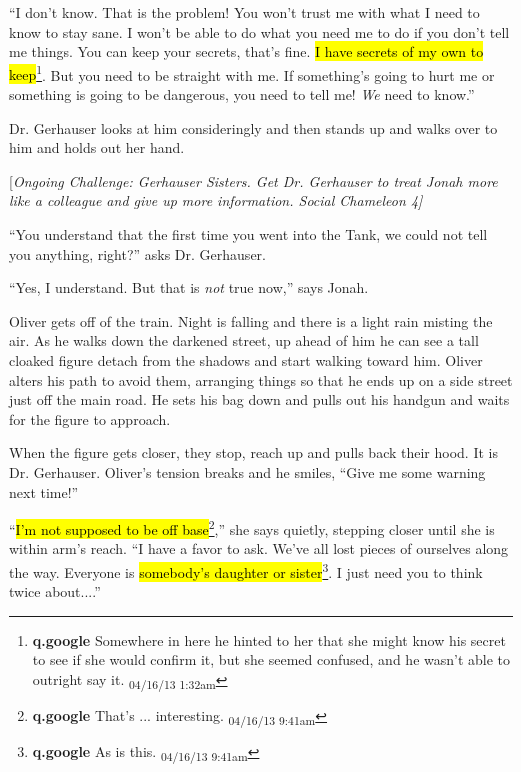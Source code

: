 ``I don't know.  That is the problem!  You won't trust me with what I need to know to stay sane.  I won't be able to do what you need me to do if you don't tell me things.  You can keep your secrets, that's fine.  \hl{I have secrets of my own to keep}\footnote{\textbf{q.google }Somewhere in here he hinted to her that she might know his secret to see if she would confirm it, but she seemed confused, and he wasn't able to outright say it. \textsubscript{04/16/13 1:32am}}.  But you need to be straight with me.  If something's going to hurt me or something is going to be dangerous, you need to tell me!  \textit{We} need to know.''

Dr. Gerhauser looks at him consideringly and then stands up and walks over to him and holds out her hand.

{[}\textit{Ongoing Challenge: Gerhauser Sisters.  Get Dr. Gerhauser to treat Jonah more like a colleague and give up more information.  Social Chameleon 4{]}}

``You understand that the first time you went into the Tank, we could not tell you anything, right?'' asks Dr. Gerhauser.

``Yes, I understand.  But that is \textit{not} true now,'' says Jonah.



Oliver gets off of the train.  Night is falling and there is a light rain misting the air.  As he walks down the darkened street, up ahead of him he can see a tall cloaked figure detach from the shadows and start walking toward him.  Oliver alters his path to avoid them, arranging things so that he ends up on a side street just off the main road.  He sets his bag down and pulls out his handgun and waits for the figure to approach.



When the figure gets closer, they stop, reach up and pulls back their hood.  It is Dr. Gerhauser.  Oliver's tension breaks and he smiles, ``Give me some warning next time!''

``\hl{I'm not supposed to be off base}\footnote{\textbf{q.google }That's ... interesting. \textsubscript{04/16/13 9:41am}},'' she says quietly, stepping closer until she is within arm's reach.  ``I have a favor to ask.  We've all lost pieces of ourselves along the way.  Everyone is \hl{somebody's daughter or sister}\footnote{\textbf{q.google }As is this. \textsubscript{04/16/13 9:41am}}.  I just need you to think twice about....''

